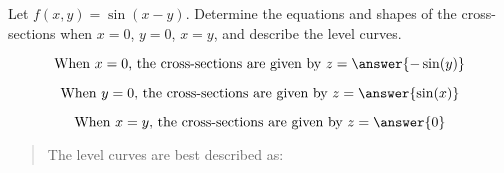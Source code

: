 \documentclass{ximera}
\author{David Guichard \and Neal Koblitz \and H. Jerome Keisler \and Albert Scheller \and Barry Balof \and Mike Wills \and Matthew Carr}
\begin{document}
\begin{exercise}




Let $f(x,y)=\sin(x-y)$. Determine the equations and shapes of the cross-sections when $x=0$, $y=0$, $x=y$, and describe the level curves.

\begin{prompt}
\[
\text{When $x=0$, the cross-sections are given by } z=\answer{-\sin(y)}
\]
\end{prompt}
\begin{prompt}
\[
\text{When $y=0$, the cross-sections are given by } z=\answer{\sin(x)}
\]
\end{prompt}
\begin{prompt}
\[
\text{When $x=y$, the cross-sections are given by } z=\answer{0}
\]
\end{prompt}

\begin{quote}
The level curves are best described as:
\end{quote}
\begin{multipleChoice}
\end{multipleChoice}


\end{exercise}
\end{document}
